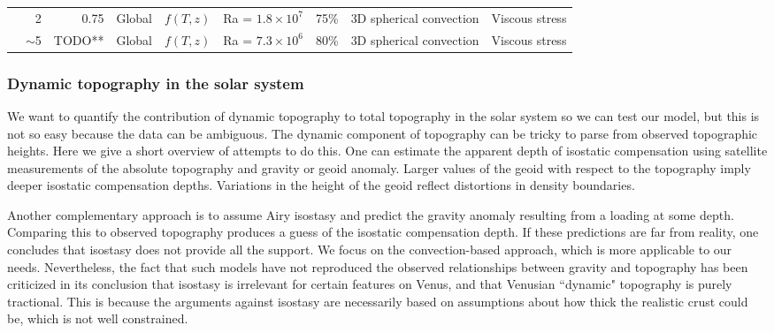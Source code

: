 \begin{landscape}
\begin{longtable}{ @{} p{4cm} r r p{2cm} p{2cm} r p{1.5cm} p{3.2cm} p{3.1cm} @{} }
\citet{Huang2013} & 2\textendash 3 & 0.75 & Global & $f(T,z)$ & Ra = $1.8\times 10^7$ & 75\% & 3D spherical convection & Viscous stress \\

\citet{Yang2016} & $\sim$5 & TODO** & Global & $f(T,z)$ &  Ra = $7.3\times 10^6$ & 80\% & 3D spherical convection & Viscous stress \\


\bottomrule


\end{longtable}
\end{landscape}


\subsubsection{Dynamic topography in the solar system}\label{sec:dyn_top_ss}

We want to quantify the contribution of dynamic topography to total topography in the solar system so we can test our model, but this is not so easy because the data can be ambiguous. The dynamic component of topography can be tricky to parse from observed topographic heights. Here we give a short overview of attempts to do this. One can estimate the apparent depth of isostatic compensation using satellite measurements of the absolute topography and gravity or geoid anomaly. Larger values of the geoid with respect to the topography imply deeper isostatic compensation depths. Variations in the height of the geoid reflect distortions in density boundaries. %

Another complementary approach \citep[e.g.,][]{Smrekar1991, Kucinskas1994} is to assume Airy isostasy and predict the gravity anomaly resulting from a loading at some depth. Comparing this to observed topography produces a guess of the isostatic compensation depth. If these predictions are far from reality, one concludes that isostasy does not provide all the support. We focus on the convection-based approach, which is more applicable to our needs. Nevertheless, the fact that such models have not reproduced the observed relationships between gravity and topography \citep{Kiefer1986} has been criticized \citep{Orth2011} in its conclusion that isostasy is irrelevant for certain features on Venus, and that Venusian ``dynamic" topography is purely tractional. This is because the arguments against isostasy are necessarily based on assumptions about how thick the realistic crust could be, which is not well constrained.

